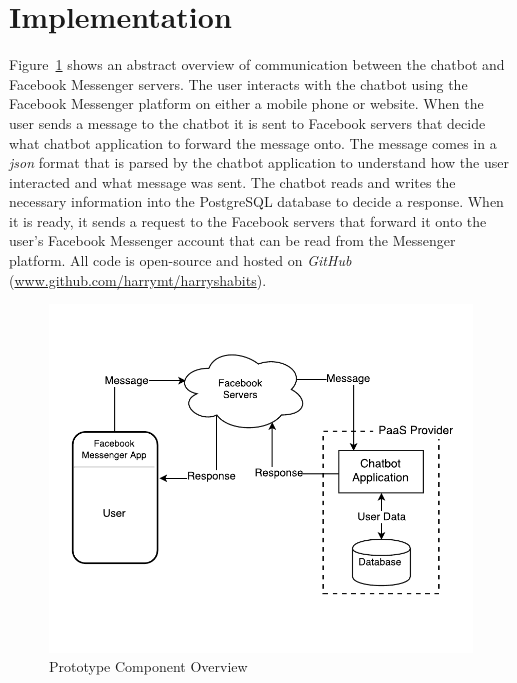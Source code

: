 
\section{Implementation}

Figure~\ref{fig:prototype_component_overview} shows an abstract overview of communication between the chatbot and Facebook Messenger servers. The user interacts with the chatbot using the Facebook Messenger platform on either a mobile phone or website. When the user sends a message to the chatbot it is sent to Facebook servers that decide what chatbot application to forward the message onto. The message comes in a \textit{json} format that is parsed by the chatbot application to understand how the user interacted and what message was sent. The chatbot reads and writes the necessary information into the PostgreSQL database to decide a response. When it is ready, it sends a request to the Facebook servers that forward it onto the user's Facebook Messenger account that can be read from the Messenger platform. All code is open-source and hosted on \textit{GitHub} (\url{www.github.com/harrymt/harryshabits}).

\begin{figure}[H]
    \centering
    \includegraphics[width=5.1in]{../resources/diagrams/chatbot-component-overview.pdf}
    \caption{Prototype Component Overview}
    \label{fig:prototype_component_overview}
\end{figure}

